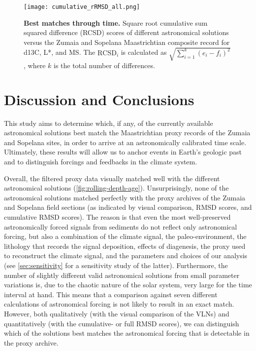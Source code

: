 \documentclass[draft]{agujournal2019}
\begin{document}
\begin{figure}
  \centering
  \texttt{[image: cumulative\_rRMSD\_all.png]}
  \caption{\label{fig:cum-RMSD-all}
    \textbf{Best matches through time.}
    Square root cumulative sum squared difference (RCSD) scores of
    different astronomical solutions versus the Zumaia and Sopelana Maastrichtian composite record
    for \gls{d13C}, \gls{L*}, and \gls{MS}.
    The \(\text{RCSD}_{i}\) is calculated as \(\sqrt{\sum_{i=1}^{k}(e_{i} - f_{i})^{2}}\), where \(k\) is the total number of differences.
  }
\end{figure}



\section{Discussion and Conclusions}\label{sec:discussion}

This study aims to determine which, if any, of the currently available astronomical solutions best match the Maastrichtian proxy records of the Zumaia and Sopelana sites, in order to arrive at an astronomically calibrated time scale.
Ultimately, these results will allow us to anchor events in Earth's geologic past and to distinguish forcings and feedbacks in the climate system.

Overall, the filtered proxy data visually matched well with the different astronomical solutions (\cref{fig:rolling-depth-age}).
Unsurprisingly, none of the astronomical solutions matched perfectly with the proxy archives of the Zumaia and Sopelana field sections (as indicated by visual comparison, \gls{RMSD} scores, and cumulative \gls{RMSD} scores).
The reason is that even the most well-preserved astronomically forced signals from sediments do not reflect only astronomical forcing, but also a combination of the climate signal, the paleo-environment, the lithology that records the signal deposition, effects of diagenesis, the proxy used to reconstruct the climate signal, and the parameters and choices of our analysis (see \ref{sec:sensitivity} for a sensitivity study of the latter).
Furthermore, the number of slightly different valid astronomical solutions from small parameter variations is, due to the chaotic nature of the solar system, very large for the time interval at hand.
This means that a comparison against seven different calculations of astronomical forcing is not likely to result in an exact match.
However, both qualitatively (with the visual comparison of the \glspl{VLN}) and quantitatively (with the cumulative- or full \gls{RMSD} scores), we can distinguish which of the solutions best matches the astronomical forcing that is detectable in the proxy archive.
\end{document}
